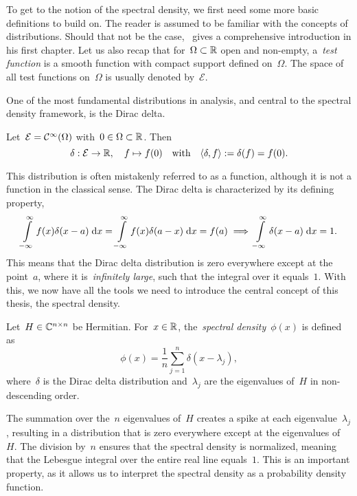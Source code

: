 To get to the notion of the spectral density, we first need some more basic definitions to build on.
The reader is assumed to be familiar with the concepts of distributions. Should that not be the case,~\cite{strichartz} gives a comprehensive introduction in his first chapter. Let us also recap that for~$\Omega \subset \mathbb{R}$ open and non-empty, a~\emph{test function} is a smooth function with compact support defined on~$\Omega$. The space of all test functions on~$\Omega$ is usually denoted by~$\mathcal{E}$.

One of the most fundamental distributions in analysis, and central to the spectral density framework, is the Dirac delta.

\begin{definition}
    Let~$\mathcal{E} = \mathcal{C}^{\infty}(\Omega)$ with~$0 \in \Omega \subset \mathbb{R}$.
    Then
    \[
    \delta: \mathcal{E} \to \mathbb{R}, \quad f \mapsto f(0) \quad \text{with} \quad \langle \delta, f \rangle := \delta(f) = f(0).
    \]
\end{definition}
\noindent
This distribution is often mistakenly referred to as a function, although it is not a function in the classical sense. The Dirac delta is characterized by its defining property,
\[
\int\limits_{-\infty}^{\infty} f(x) \delta(x-a) \;\mathrm{d}x = \int\limits_{-\infty}^{\infty} f(x) \delta(a-x) \;\mathrm{d}x = f(a) \implies \int\limits_{-\infty}^{\infty} \delta(x-a) \;\mathrm{d}x = 1.
\]
This means that the Dirac delta distribution is zero everywhere except at the point~$a$, where it is~\emph{infinitely large}, such that the integral over it equals~$1$. With this, we now have all the tools we need to introduce the central concept of this thesis, the spectral density.

\begin{definition}
    Let~$H \in \mathbb{C}^{n \times n}$ be Hermitian. For~$x \in \mathbb{R}$, the~\emph{spectral density}~$\phi(x)$ is defined as
    \[
    \phi(x) = \frac{1}{n} \sum_{j=1}^{n} \delta(x - \lambda_j),
    \]
    where~$\delta$ is the Dirac delta distribution and~$\lambda_j$ are the eigenvalues of~$H$ in non-descending order.
\end{definition}

The summation over the~$n$ eigenvalues of~$H$ creates a spike at each eigenvalue~$\lambda_j$, resulting in a distribution that is zero everywhere except at the eigenvalues of~$H$. The division by~$n$ ensures that the spectral density is normalized, meaning that the Lebesgue integral over the entire real line equals~$1$. This is an important property, as it allows us to interpret the spectral density as a probability density function.


